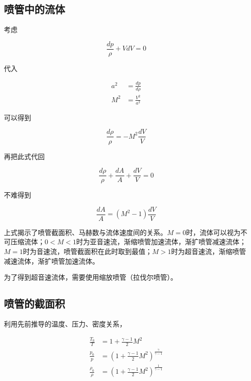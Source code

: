\subsection{喷管中的流体}

考虑

\begin{equation*}
    \frac{d p}{\rho}+V d V=0
\end{equation*}

代入

\begin{align*}
    a^2&=\frac{dp}{d\rho}\\ 
    M^2&=\frac{V^2}{a^2}
\end{align*}

可以得到

\begin{equation*}
    \frac{d \rho}{\rho}=-M^{2} \frac{d V}{V}
\end{equation*}

再把此式代回

\begin{equation*}
    \frac{d \rho}{\rho}+\frac{d A}{A}+\frac{d V}{V}=0
\end{equation*}

不难得到

\begin{equation*}
    \frac{d A}{A}=\left(M^{2}-1\right) \frac{d V}{V}
\end{equation*}

上式揭示了喷管截面积、马赫数与流体速度间的关系。$M=0$时，流体可以视为不可压缩流体；$0<M<1$时为亚音速流，渐缩喷管加速流体，渐扩喷管减速流体；$M=1$时为音速流，喷管截面积在此时取到最值；$M>1$时为超音速流，渐缩喷管减速流体，渐扩喷管加速流体。

为了得到超音速流体，需要使用缩放喷管（拉伐尔喷管）。

\subsection{喷管的截面积}

利用先前推导的温度、压力、密度关系，

\begin{align*}
    \frac{T_{0}}{T}&=1+\frac{\gamma-1}{2} M^{2}\\ 
    \frac{p_{0}}{p}&=\left(1+\frac{\gamma-1}{2} M^{2}\right)^{\frac{\gamma}{\gamma-1}}\\ 
    \frac{\rho_{0}}{\rho}&=\left(1+\frac{\gamma-1}{2} M^{2}\right)^{\frac{1}{\gamma-1}}
\end{align*}


